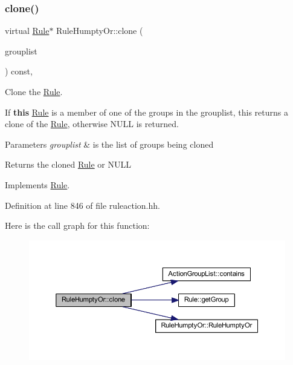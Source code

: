 \subsubsection{\texorpdfstring{clone()}{clone()}}
{\footnotesize\ttfamily virtual \mbox{\hyperlink{class_rule}{Rule}}$\ast$ Rule\+Humpty\+Or\+::clone (\begin{DoxyParamCaption}\item[{const \mbox{\hyperlink{class_action_group_list}{Action\+Group\+List}} \&}]{grouplist }\end{DoxyParamCaption}) const\hspace{0.3cm}{\ttfamily [inline]}, {\ttfamily [virtual]}}



Clone the \mbox{\hyperlink{class_rule}{Rule}}. 

If {\bfseries{this}} \mbox{\hyperlink{class_rule}{Rule}} is a member of one of the groups in the grouplist, this returns a clone of the \mbox{\hyperlink{class_rule}{Rule}}, otherwise N\+U\+LL is returned. 
\begin{DoxyParams}{Parameters}
{\em grouplist} & is the list of groups being cloned \\
\hline
\end{DoxyParams}
\begin{DoxyReturn}{Returns}
the cloned \mbox{\hyperlink{class_rule}{Rule}} or N\+U\+LL 
\end{DoxyReturn}


Implements \mbox{\hyperlink{class_rule_a70de90a76461bfa7ea0b575ce3c11e4d}{Rule}}.



Definition at line 846 of file ruleaction.\+hh.

Here is the call graph for this function\+:
\nopagebreak
\begin{figure}[H]
\begin{center}
\leavevmode
\includegraphics[width=350pt]{class_rule_humpty_or_a7564110956850ec05005818ada05b515_cgraph}
\end{center}
\end{figure}
\mbox{\label{class_rule_humpty_or_ac0fb90faa8e1028684a89077c3a86c56}} 
